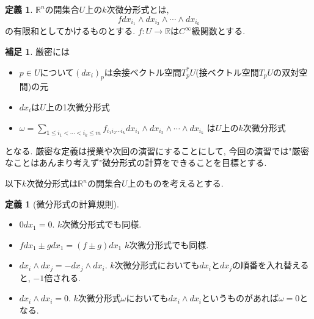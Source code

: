 \documentclass[dvipdfmx,a4paper,11pt]{article}
\newcommand{\R}{\mathbb{R}}
\theoremstyle{definition}
\newtheorem{dfn}[thm]{定義}
\newtheorem{rem}[thm]{補足}
\begin{document}
 \begin{tcolorbox}[
    colback = white,
    colframe = green!35!black,
    fonttitle = \bfseries,
    breakable = true]
\begin{dfn}
$\R^n$の開集合$U$上の$k$次微分形式とは, 
    $$
f d x_{i_1}\wedge dx_{i_2} \wedge \cdots \wedge dx_{i_k}
    $$
    の有限和としてかけるものとする. $f : U \rightarrow \R$は$C^{\infty}$級関数とする.     
   \end{dfn}
    \end{tcolorbox}
   \begin{rem}
   厳密には
   \begin{itemize}
    \setlength{\parskip}{0cm}
  \setlength{\itemsep}{2pt} 
   \item $p \in U$について$(dx_i)_p$は余接ベクトル空間$T_{p}^{*}U$(接ベクトル空間$T_{p}U$の双対空間)の元
   \item $dx_i$は$U$上の1次微分形式 
   \item  $\omega = \sum_{ 1 \le i_1< \cdots < i_k\le m }f_{i_1 i_2 \cdots i_k}d x_{i_1}\wedge dx_{i_2} \wedge \cdots \wedge dx_{i_k}$ は$U$上の$k$次微分形式
   \end{itemize}
   となる. 厳密な定義は授業や次回の演習にすることにして, 今回の演習では"厳密なことはあんまり考えず"微分形式の計算をできることを目標とする. 
   \end{rem}

以下$k$次微分形式は$\R^n$の開集合$U$上のものを考えるとする. 
 \begin{tcolorbox}[
    colback = white,
    colframe = green!35!black,
    fonttitle = \bfseries,
    breakable = true]
\begin{dfn}[微分形式の計算規則]
\text{}
   \begin{itemize}
    \setlength{\parskip}{0cm}
  \setlength{\itemsep}{2pt} 
\item $0 dx_1 =0$. $k$次微分形式でも同様. 
\item  $f dx_1 \pm g dx_1 = (f \pm g) dx_1$ $k$次微分形式でも同様. 
\item  $dx_i \wedge dx_j = - dx_j \wedge dx_i$. $k$次微分形式においても$dx_i$と$dx_j $の順番を入れ替えると, $-1$倍される.
\item $dx_i \wedge dx_i=0 $. $k$次微分形式$\omega$においても$dx_i \wedge dx_i$というものがあれば$\omega=0$となる. 
\end{itemize}
 \end{dfn}
    \end{tcolorbox}
    
\end{document}
